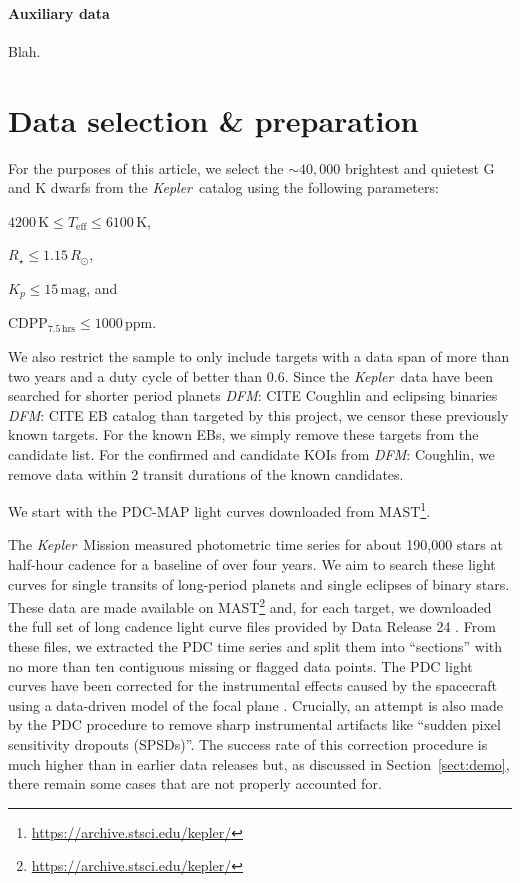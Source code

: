 \documentclass[preprint]{aastex}
\newcommand{\project}[1]{\textsl{#1}}
\newcommand{\kepler}{\project{Kepler}}
\newcommand{\paper}{article}
\newcommand{\sectionname}{Section}
\newcommand{\sectref}[1]{\ref{sect:#1}}
\newcommand{\Sect}[1]{\sectionname~\sectref{#1}}
\newcommand{\sect}[1]{\Sect{#1}}
\newcommand{\sectlabel}[1]{\label{sect:#1}}
\newcommand{\todo}[3]{{\color{#2}\emph{#1}: #3}}
\newcommand{\dfmtodo}[1]{\todo{DFM}{red}{#1}}
\newcommand{\unit}[1]{{\ensuremath{\,\mathrm{#1}}}}
\begin{document}
\paragraph{Auxiliary data}

Blah.


\section{Data selection \& preparation}\sectlabel{data}

For the purposes of this \paper, we select the $\sim40,000$ brightest and
quietest G and K dwarfs from the \kepler\ catalog using the following
parameters:
\begin{itemize}
{\item $4200\unit{K} \le T_\mathrm{eff} \le 6100\unit{K}$,}
{\item $R_\star \le 1.15\,R_\odot$,}
{\item $K_p \le 15\unit{mag}$, and}
{\item $\mathrm{CDPP}_{7.5\unit{hrs}} \le 1000\unit{ppm}$.}
\end{itemize}
We also restrict the sample to only include targets with a data span of more
than two years and a duty cycle of better than $0.6$.
Since the \kepler\ data have been searched for shorter period planets
\dfmtodo{CITE Coughlin} and eclipsing binaries \dfmtodo{CITE EB catalog} than
targeted by this project, we censor these previously known targets.
For the known EBs, we simply remove these targets from the candidate list.
For the confirmed and candidate KOIs from \dfmtodo{Coughlin}, we remove data
within 2 transit durations of the known candidates.


We start with the PDC-MAP light curves downloaded from
MAST\footnote{\url{https://archive.stsci.edu/kepler/}}.



The \kepler\ Mission measured photometric time series for about 190,000 stars
at half-hour cadence for a baseline of over four years.
We aim to search these light curves for single transits of long-period planets
and single eclipses of binary stars.
These data are made available on
MAST\footnote{\url{https://archive.stsci.edu/kepler/}} and, for each target,
we downloaded the full set of long cadence light curve files provided by Data
Release 24 \citep{Thompson:2015}.
From these files, we extracted the PDC time series and split them into
``sections'' with no more than ten contiguous missing or flagged data points.
The PDC light curves have been corrected for the instrumental effects caused
by the spacecraft using a data-driven model of the focal plane
\citep{Stumpe:2012, Smith:2012}.
Crucially, an attempt is also made by the PDC procedure to remove sharp
instrumental artifacts like ``sudden pixel sensitivity dropouts (SPSDs)''.
The success rate of this correction procedure is much higher than in earlier
data releases but, as discussed in \sect{demo}, there remain some cases that
are not properly accounted for.
\end{document}
